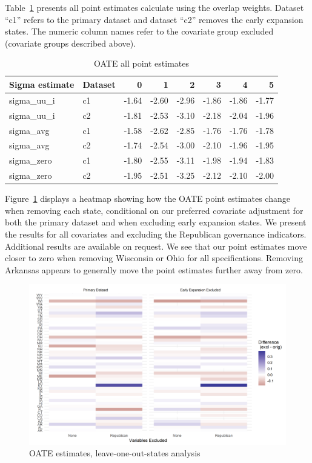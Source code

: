 Table~\ref{tab:oatesensitive} presents all point estimates calculate using the overlap weights. Dataset ``c1'' refers to the primary dataset and dataset ``c2'' removes the early expansion states. The numeric column names refer to the covariate group excluded (covariate groups described above).

\begin{table}[ht]
\centering
\caption{OATE all point estimates}
\label{tab:oatesensitive}
\begin{tabular}{llrrrrrr}
  \hline
Sigma estimate & Dataset & 0 & 1 & 2 & 3 & 4 & 5 \\ 
  \hline
sigma\_uu\_i & c1 & -1.64 & -2.60 & -2.96 & -1.86 & -1.86 & -1.77 \\ 
  sigma\_uu\_i & c2 & -1.81 & -2.53 & -3.10 & -2.18 & -2.04 & -1.96 \\ 
  sigma\_avg & c1 & -1.58 & -2.62 & -2.85 & -1.76 & -1.76 & -1.78 \\ 
  sigma\_avg & c2 & -1.74 & -2.54 & -3.00 & -2.10 & -1.96 & -1.95 \\ 
  sigma\_zero & c1 & -1.80 & -2.55 & -3.11 & -1.98 & -1.94 & -1.83 \\ 
  sigma\_zero & c2 & -1.95 & -2.51 & -3.25 & -2.12 & -2.10 & -2.00 \\ 
   \hline
\end{tabular}
\end{table}

Figure~\ref{fig:oateheatmap} displays a heatmap showing how the OATE point estimates change when removing each state, conditional on our preferred covariate adjustment for both the primary dataset and when excluding early expansion states. We present the results for all covariates and excluding the Republican governance indicators. Additional results are available on request. We see that our point estimates move closer to zero when removing Wisconsin or Ohio for all specifications. Removing Arkansas appears to generally move the point estimates further away from zero.

\begin{figure}[]
\begin{center}
    \caption{OATE estimates, leave-one-out-states analysis}
    \label{fig:oateheatmap}
    \includegraphics[scale=0.6]{01_Plots/oate-loo-state-cov-group-heatmap-states.png}
\end{center}
\end{figure}
